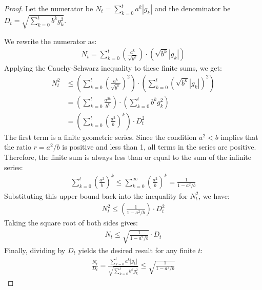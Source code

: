 \documentclass[11pt, letterpaper]{article}
\begin{document}
\begin{proof}
Let the numerator be \(N_t = \sum_{k=0}^{t} a^k |g_k|\) and the denominator be \(D_t = \sqrt{\sum_{k=0}^{t} b^k g_k^2}\).

We rewrite the numerator as:
\begin{align}
    N_t = \sum_{k=0}^{t} \left( \frac{a^k}{\sqrt{b^k}} \right) \cdot \left( \sqrt{b^k} |g_k| \right)
\end{align}
Applying the Cauchy-Schwarz inequality to these finite sums, we get:
\begin{align}
    N_t^2 &\le \left( \sum_{k=0}^{t} \left( \frac{a^k}{\sqrt{b^k}} \right)^2 \right) \cdot \left( \sum_{k=0}^{t} \left( \sqrt{b^k} |g_k| \right)^2 \right) \nonumber\\
    &= \left( \sum_{k=0}^{t} \frac{a^{2k}}{b^k} \right) \cdot \left( \sum_{k=0}^{t} b^k g_k^2 \right) \nonumber\\
    &= \left( \sum_{k=0}^{t} \left(\frac{a^2}{b}\right)^k \right) \cdot D_t^2
\end{align}
The first term is a finite geometric series. Since the condition \(a^2 < b\) implies that the ratio \(r = a^2/b\) is positive and less than 1, all terms in the series are positive. Therefore, the finite sum is always less than or equal to the sum of the infinite series:
\begin{align}
    \sum_{k=0}^{t} \left(\frac{a^2}{b}\right)^k \le \sum_{k=0}^{\infty} \left(\frac{a^2}{b}\right)^k = \frac{1}{1 - a^2/b}
\end{align}
Substituting this upper bound back into the inequality for \(N_t^2\), we have:
\begin{align}
    N_t^2 \le \left( \frac{1}{1 - a^2/b} \right) \cdot D_t^2
\end{align}
Taking the square root of both sides gives:
\begin{align}
    N_t \le \sqrt{\frac{1}{1 - a^2/b}} \cdot D_t
\end{align}
Finally, dividing by \(D_t\) yields the desired result for any finite \(t\):
\begin{align}
    \frac{N_t}{D_t} = \frac{\sum_{k=0}^{t} a^k |g_k|}{\sqrt{\sum_{k=0}^{t} b^k g_k^2}} \le \sqrt{\frac{1}{1 - a^2/b}}
\end{align}
\end{proof}
\end{document}
